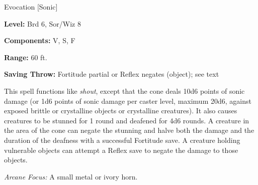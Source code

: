 \label{spell:Greater Shout}

Evocation [Sonic]

\textbf{Level:} Brd 6, Sor/Wiz 8

\textbf{Components:} V, S, F

\textbf{Range:} 60 ft.

\textbf{Saving Throw:} Fortitude partial or Reflex negates (object); see text

This spell functions like \textit{shout}, except that the cone deals 10d6 points 
of sonic damage (or 1d6 points of sonic damage per caster level, maximum 20d6, 
against exposed brittle or crystalline objects or crystalline creatures). It also 
causes creatures to be stunned for 1 round and deafened for 4d6 rounds. A creature 
in the area of the cone can negate the stunning and halve both the damage and the 
duration of the deafness with a successful Fortitude save. A creature holding vulnerable 
objects can attempt a Reflex save to negate the damage to those objects.

\textit{Arcane Focus:} A small metal or ivory horn.

